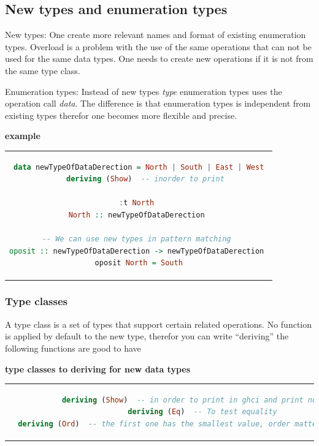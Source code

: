 \subsection{New types and enumeration types}
New types: One create more relevant names and format of existing enumeration types.
Overload is a problem with the use of the same operations that can not be used for the same data types.
One needs to create new operations if it is not from the same type class.

Enumeration types: Instead of new types \emph{type} enumeration types uses the operation call \emph{data}.
The difference is that enumeration types is independent from existing types therefor
one becomes more flexible and precise.

\textbf{example}
\begin{center}
\begin{tabular}{c}
\begin{lstlisting}[language=Haskell]
data newTypeOfDataDerection = North | South | East | West
   deriving (Show)  -- inorder to print

:t North 
North :: newTypeOfDataDerection 

-- We can use new types in pattern matching 
oposit :: newTypeOfDataDerection -> newTypeOfDataDerection 
oposit North = South
\end{lstlisting}
\end{tabular}
\end{center}


\subsubsection{Type classes}
A type class is a set of types that support certain related operations.
No function is applied by default to the new type, therefor
you can write ``deriving'' the following functions are good to have

\textbf{type classes to deriving for new data types}
\begin{center}
\begin{tabular}{c}
\begin{lstlisting}[language=Haskell]
  deriving (Show)  -- in order to print in ghci and print normal
  deriving (Eq)  -- To test equality
  deriving (Ord)  -- the first one has the smallest value, order matter for comparison
\end{lstlisting}
\end{tabular}
\end{center}

